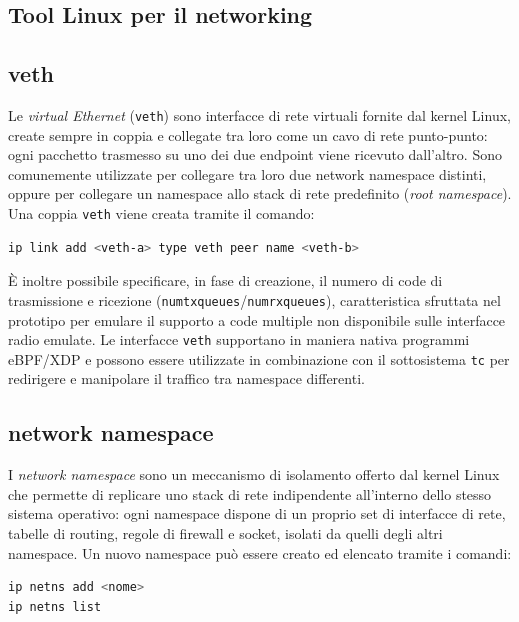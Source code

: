 \documentclass[12pt,a4paper,twoside]{book}
\begin{document}
\begin{appendices}
\chapter{Tool Linux per il networking}
\label{Appendice:tool_networking}

\section{veth}
\label{subsec:veth}
Le \textit{virtual Ethernet} (\texttt{veth}) sono interfacce di rete virtuali fornite dal kernel Linux, create sempre in coppia e collegate tra loro come un cavo di rete punto-punto: ogni pacchetto trasmesso su uno dei due endpoint viene ricevuto dall'altro. Sono comunemente utilizzate per collegare tra loro due network namespace distinti, oppure per collegare un namespace allo stack di rete predefinito (\textit{root namespace}). Una coppia \texttt{veth} viene creata tramite il comando:

\begin{lstlisting}[language=bash, basicstyle=\ttfamily\small]
ip link add <veth-a> type veth peer name <veth-b>
\end{lstlisting}

È inoltre possibile specificare, in fase di creazione, il numero di code di trasmissione e ricezione (\texttt{numtxqueues}/\texttt{numrxqueues}), caratteristica sfruttata nel prototipo per emulare il supporto a code multiple non disponibile sulle interfacce radio emulate. Le interfacce \texttt{veth} supportano in maniera nativa programmi eBPF/XDP e possono essere utilizzate in combinazione con il sottosistema \texttt{tc} per redirigere e manipolare il traffico tra namespace differenti.

\section{network namespace}
\label{subsec:namespaces}
I \textit{network namespace} sono un meccanismo di isolamento offerto dal kernel Linux che permette di replicare uno stack di rete indipendente all'interno dello stesso sistema operativo: ogni namespace dispone di un proprio set di interfacce di rete, tabelle di routing, regole di firewall e socket, isolati da quelli degli altri namespace. Un nuovo namespace può essere creato ed elencato tramite i comandi:

\begin{lstlisting}[language=bash, basicstyle=\ttfamily\small]
ip netns add <nome>
ip netns list
\end{lstlisting}


\end{appendices}
\end{document}
